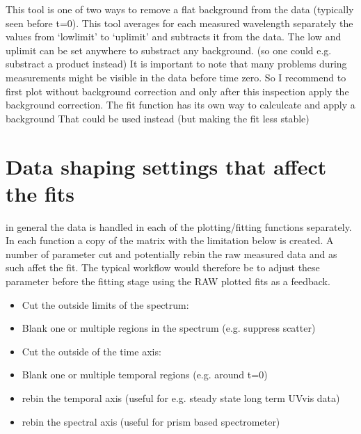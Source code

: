 \documentclass[letterpaper,10pt,english]{sphinxmanual}
\begin{document}
This tool is one of two ways to remove a flat background from the data (typically seen before t=0).
This tool averages for each measured  wavelength separately the values from ‘lowlimit’ to ‘uplimit’ and
subtracts it from the data. The low and uplimit can be set
anywhere to substract any background. (so one could e.g. substract a product
instead) It is important to note that many problems during measurements might
be visible in the data before time zero. So I recommend to first
plot without background correction and only after this inspection
apply the background correction.
The fit function has its own way to calculcate and apply a background
That could be used instead (but making the fit less stable)


\section{Data shaping settings that affect the fits}
\label{\detokenize{Shaping:data-shaping-settings-that-affect-the-fits}}
in general the data is handled in each of the plotting/fitting functions
separately. In each function a copy of the matrix with the limitation
below is created.
A number of parameter cut and potentially rebin the raw measured data and as such affet the fit.
The typical workflow would therefore be to adjust these parameter before the fitting stage using the
RAW plotted fits as a feedback.
\begin{itemize}
\item {} 
Cut the outside limits of the spectrum: 

\item {} 
Blank one or multiple regions in the spectrum (e.g. suppress scatter) 

\item {} 
Cut the outside of the time axis: 

\item {} 
Blank one or multiple temporal regions (e.g. around t=0) 

\item {} 
rebin the temporal axis (useful for e.g. steady state long term UV\sphinxhyphen{}vis data) 

\item {} 
rebin the spectral axis (useful for prism based spectrometer) 

\end{itemize}
\end{document}
